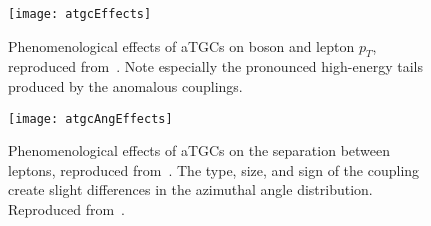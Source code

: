 \begin{figure}[h]
\centering
\texttt{[image: atgcEffects]} 
\caption[Phenomenological effects of aTGCs on boson and lepton
$p_T$.]{Phenomenological effects of aTGCs on boson and lepton $p_T$, reproduced
from~\cite{Baur:2000vi}. Note especially the pronounced high-energy tails
produced by the anomalous couplings.}
\label{fig:atgcEffects}
\end{figure}

\begin{figure}[h]
\centering
\texttt{[image: atgcAngEffects]} 
\caption[Phenomenological effects of aTGCs on lepton
separation.]{Phenomenological effects of aTGCs on the separation between leptons, reproduced
from~\cite{Baur:2000vi}. The type, size, and sign of the coupling create slight
differences in the azimuthal angle distribution. Reproduced
from~\cite{Baur:2000vi}.}
\label{fig:atgcAngEffects}
\end{figure}

